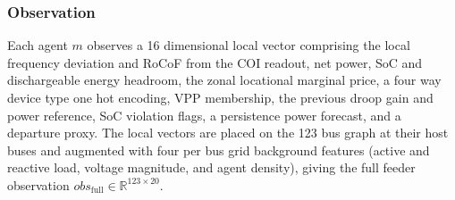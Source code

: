 \documentclass[lettersize,journal]{IEEEtran}
\begin{document}
	
	
	\subsubsection{Observation}
	Each agent $m$ observes a 16 dimensional local vector comprising the local frequency deviation and RoCoF from the COI readout, net power, SoC and dischargeable energy headroom, the zonal locational marginal price, a four way device type one hot encoding, VPP membership, the previous droop gain and power reference, SoC violation flags, a persistence power forecast, and a departure proxy. The local vectors are placed on the 123 bus graph at their host buses and augmented with four per bus grid background features (active and reactive load, voltage magnitude, and agent density), giving the full feeder observation $\mathit{obs}_{\mathrm{full}}\in\mathbb{R}^{123\times20}$.
	
\end{document}
